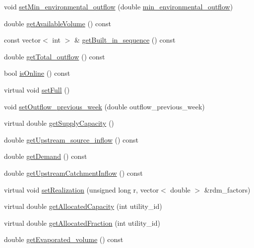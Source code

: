 \begin{DoxyCompactItemize}
\item 
void \mbox{\hyperlink{classWaterSource_a406246432d29f49189d53207ab1d895a}{set\+Min\+\_\+environmental\+\_\+outflow}} (double \mbox{\hyperlink{classWaterSource_adae67ac96597e4b25332002b88a9a52b}{min\+\_\+environmental\+\_\+outflow}})
\item 
double \mbox{\hyperlink{classWaterSource_a8eae3b16fc0f37780c1df827386f656e}{get\+Available\+Volume}} () const
\item 
const vector$<$ int $>$ \& \mbox{\hyperlink{classWaterSource_a09b60eb2e318c72a42cd6bdd336a6f67}{get\+Built\+\_\+in\+\_\+sequence}} () const
\item 
double \mbox{\hyperlink{classWaterSource_a7678e05e3e73b927c0b47e3041d7415f}{get\+Total\+\_\+outflow}} () const
\item 
bool \mbox{\hyperlink{classWaterSource_a130fd661ff31c53115cca23e4e2f210a}{is\+Online}} () const
\item 
virtual void \mbox{\hyperlink{classWaterSource_a5f8007eb1ae604cfaa67ebb4c0c46eb1}{set\+Full}} ()
\item 
void \mbox{\hyperlink{classWaterSource_ab53d376a425b8db603382ba27b52b1d4}{set\+Outflow\+\_\+previous\+\_\+week}} (double outflow\+\_\+previous\+\_\+week)
\item 
virtual double \mbox{\hyperlink{classWaterSource_aa4cbbd1ee0fc5ea9291eb5d8067b3aa0}{get\+Supply\+Capacity}} ()
\item 
double \mbox{\hyperlink{classWaterSource_ad7e60efd7395f8d3e674e602226e5ac1}{get\+Upstream\+\_\+source\+\_\+inflow}} () const
\item 
double \mbox{\hyperlink{classWaterSource_ac57d6b292490333b5bc14233bce326ce}{get\+Demand}} () const
\item 
double \mbox{\hyperlink{classWaterSource_afd2a153ba8f4ecaa9f8fa851d5a1727c}{get\+Upstream\+Catchment\+Inflow}} () const
\item 
virtual void \mbox{\hyperlink{classWaterSource_af72660e62fda45b6ae53da5f0afd86db}{set\+Realization}} (unsigned long r, vector$<$ double $>$ \&rdm\+\_\+factors)
\item 
virtual double \mbox{\hyperlink{classWaterSource_a44102a0eafdaebd86f0ed8dabb313733}{get\+Allocated\+Capacity}} (int utility\+\_\+id)
\item 
virtual double \mbox{\hyperlink{classWaterSource_a1843ada21b8e7500d80a5a7db10621b3}{get\+Allocated\+Fraction}} (int utility\+\_\+id)
\item 
double \mbox{\hyperlink{classWaterSource_a00b156a153fc24097e4c8a4e5c46c4e0}{get\+Evaporated\+\_\+volume}} () const

\end{DoxyCompactItemize}
